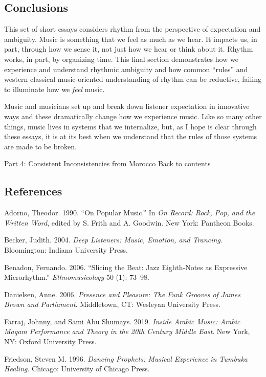 \documentclass[twoside]{article}
\begin{document}
\hypertarget{conclusions}{%
\subsection{Conclusions}\label{conclusions}}

This set of short essays considers rhythm from the perspective of
expectation and ambiguity. Music is something that we feel as much as we
hear. It impacts us, in part, through how we sense it, not just how we
hear or think about it. Rhythm works, in part, by organizing time. This
final section demonstrates how we experience and understand rhythmic
ambiguity and how common ``rules'' and western classical music-oriented
understanding of rhythm can be reductive, failing to illuminate how we
\emph{feel} music.

Music and musicians set up and break down listener expectation in
innovative ways and these dramatically change how we experience music.
Like so many other things, music lives in systems that we internalize,
but, as I hope is clear through these essays, it is at its best when we
understand that the rules of those systems are made to be broken.

Part 4: Consistent Inconsistencies from Morocco Back to contents

\hypertarget{references}{%
\subsection{References}\label{references}}

Adorno, Theodor. 1990. ``On Popular Music.'' In \emph{On Record: Rock,
Pop, and the Written Word}, edited by S. Frith and A. Goodwin. New York:
Pantheon Books.

Becker, Judith. 2004. \emph{Deep Listeners: Music, Emotion, and
Trancing}. Bloomington: Indiana University Press.

Benadon, Fernando. 2006. ``Slicing the Beat: Jazz Eighth-Notes as
Expressive Microrhythm.'' \emph{Ethnomusicology} 50 (1): 73--98.

Danielsen, Anne. 2006. \emph{Presence and Pleasure: The Funk Grooves of
James Brown and Parliament}. Middletown, CT: Wesleyan University Press.

Farraj, Johnny, and Sami Abu Shumays. 2019. \emph{Inside Arabic Music:
Arabic Maqam Performance and Theory in the 20th Century Middle East}.
New York, NY: Oxford University Press.

Friedson, Steven M. 1996. \emph{Dancing Prophets: Musical Experience in
Tumbuka Healing}. Chicago: University of Chicago Press.
\end{document}
